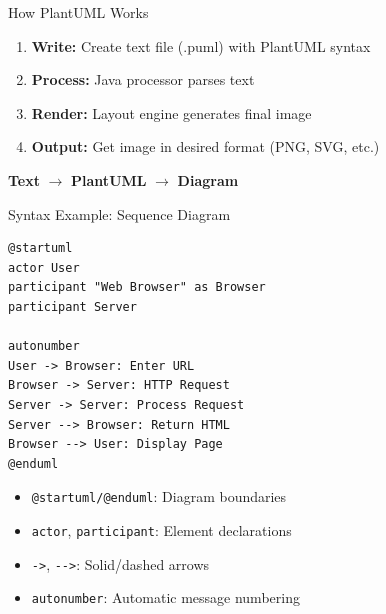 \documentclass{beamer}
\begin{document}
\begin{frame}{How PlantUML Works}
    \begin{enumerate}
        \item \textbf{Write:} Create text file (.puml) with PlantUML syntax
        \item \textbf{Process:} Java processor parses text
        \item \textbf{Render:} Layout engine generates final image
        \item \textbf{Output:} Get image in desired format (PNG, SVG, etc.)
    \end{enumerate}
    
    \begin{center}
    \textbf{Text} $\rightarrow$ \textbf{PlantUML} $\rightarrow$ \textbf{Diagram}
    \end{center}
\end{frame}

\begin{frame}[fragile,t]{Syntax Example: Sequence Diagram}
    \begin{lstlisting}[style=plantuml]
@startuml
actor User
participant "Web Browser" as Browser
participant Server

autonumber
User -> Browser: Enter URL
Browser -> Server: HTTP Request
Server -> Server: Process Request
Server --> Browser: Return HTML
Browser --> User: Display Page
@enduml
    \end{lstlisting}

    
    
    \small
    \begin{itemize}
        \item \texttt{@startuml/@enduml}: Diagram boundaries
        \item \texttt{actor}, \texttt{participant}: Element declarations
        \item \texttt{->}, \texttt{-{}->}: Solid/dashed arrows
        \item \texttt{autonumber}: Automatic message numbering
    \end{itemize}
\end{frame}
\end{document}

